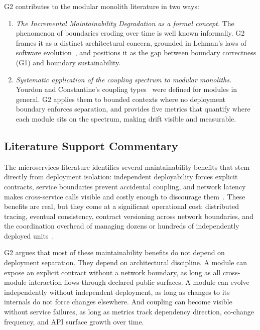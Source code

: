 G2 contributes to the modular monolith literature in two ways:

\begin{enumerate}[itemsep=8pt,topsep=2pt]
  \item \emph{The Incremental Maintainability Degradation as a formal concept.} The phenomenon of boundaries eroding over time is well known informally. G2 frames it as a distinct architectural concern, grounded in Lehman's laws of software evolution~\cite{lehman1980programs}, and positions it as the gap between boundary correctness (G1) and boundary sustainability.

  \item \emph{Systematic application of the coupling spectrum to modular monoliths.} Yourdon and Constantine's coupling types~\cite{yourdon1979structured} were defined for modules in general. G2 applies them to bounded contexts where no deployment boundary enforces separation, and provides five metrics that quantify where each module sits on the spectrum, making drift visible and measurable.
\end{enumerate}

\subsection*{Literature Support Commentary}
The microservices literature identifies several maintainability benefits that stem directly from deployment isolation: independent deployability forces explicit contracts, service boundaries prevent accidental coupling, and network latency makes cross-service calls visible and costly enough to discourage them~\cite{fritzsch2019,deLauretis2019from}. These benefits are real, but they come at a significant operational cost: distributed tracing, eventual consistency, contract versioning across network boundaries, and the coordination overhead of managing dozens or hundreds of independently deployed units~\cite{arya2024beyond,berry2024isItWorth}.

G2 argues that most of these maintainability benefits do not depend on deployment separation. They depend on architectural discipline. A module can expose an explicit contract without a network boundary, as long as all cross-module interaction flows through declared public surfaces. A module can evolve independently without independent deployment, as long as changes to its internals do not force changes elsewhere. And coupling can become visible without service failures, as long as metrics track dependency direction, co-change frequency, and API surface growth over time.

